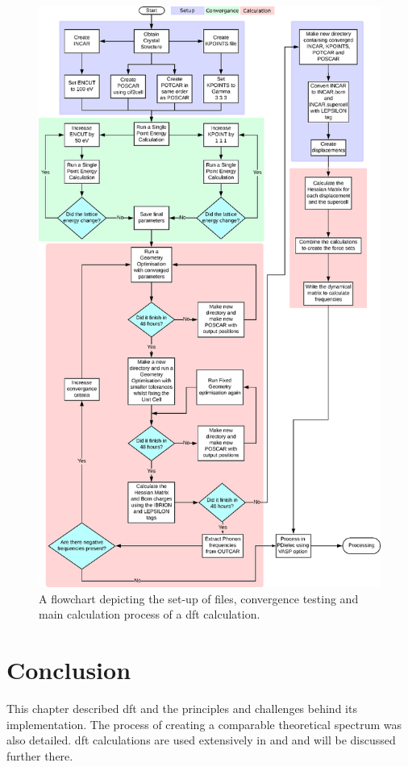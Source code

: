 \begin{figure}
    \centering
    \includegraphics[scale=1.08]{Figures/Misc/Theory/VASP_Phonopy Workglow.png}
    \captionsetup{font = footnotesize, justification = centering}
    \caption[A Flowchart Depicting the Calculation Process]{A flowchart depicting the set-up of files, convergence testing and main calculation process of a \acrshort{dft} calculation.}
    \label{fig:workflow}
\end{figure}

\section{Conclusion}
This chapter described \acrshort{dft} and the principles and challenges behind its implementation. The process of creating a comparable theoretical spectrum was also detailed. \acrshort{dft} calculations are used extensively in  and  and will be discussed further there.